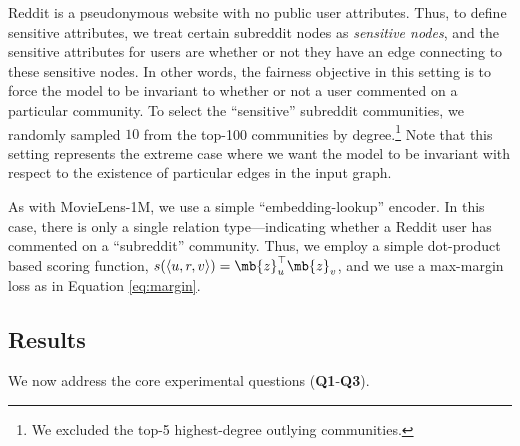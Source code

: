 Reddit is a pseudonymous website with no public user attributes.  
Thus, to define sensitive attributes, we treat certain subreddit nodes as {\em sensitive nodes}, and the sensitive attributes for users are whether or not they have an edge connecting to these sensitive nodes.
In other words, the fairness objective in this setting is to force the model to be invariant to whether or not a user commented on a particular community. 
To select the ``sensitive'' subreddit communities, we randomly sampled $10$ from the top-100 communities by degree.\footnote{We excluded the top-5 highest-degree outlying communities.} 
Note that this setting represents the extreme case where we want the model to be invariant with respect to the existence of particular edges in the input graph. 

As with MovieLens-1M, we use a simple ``embedding-lookup'' encoder. 
In this case, there is only a single relation type---indicating whether a Reddit user has commented on a ``subreddit'' community.
Thus, we employ a simple dot-product based scoring function,
   $s(\langle u, r, v \rangle) = \mb{z}_u^\top\mb{z}_v$,
and we use a max-margin loss as in Equation \eqref{eq:margin}. 

\subsection{Results}
We now address the core experimental questions (\textbf{Q1}-\textbf{Q3}). 

